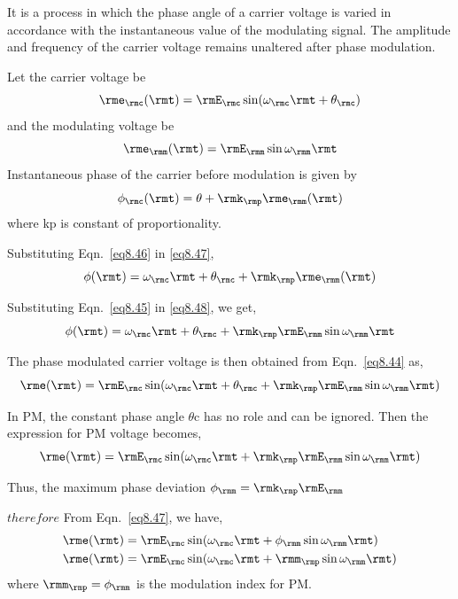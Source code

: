 It is a process in which the phase angle of a carrier voltage is
varied in accordance with the instantaneous value of the modulating
signal. The amplitude and frequency of the carrier voltage remains
unaltered after phase modulation.


\smallskip
Let the carrier voltage be
\begin{equation}
\rme_\rmc(\rmt) = \rmE_\rmc \sin (\omega_\rmc \rmt + \theta_\rmc)\label{eq8.41}
\end{equation}
and the modulating voltage be 
\begin{equation}
\rme_\rmm(\rmt) = \rmE_\rmm \sin \omega_\rmm \rmt \label{eq8.42}
\end{equation}
Instantaneous phase of the carrier before modulation is given by
\begin{equation}
\phi_\rmc (\rmt) = \theta + \rmk_\rmp \rme_\rmm(\rmt) \label{8.43}
\end{equation}
where kp is constant of proportionality.

Substituting Eqn.~\eqref{eq8.46} in \eqref{eq8.47},
\begin{equation}
\phi(\rmt) = \omega_\rmc \rmt + \theta_\rmc + \rmk_\rmp \rme_\rmm(\rmt)\label{eq8.44}
\end{equation}

Substituting Eqn.~\eqref{eq8.45} in \eqref{eq8.48}, we get,
\begin{equation}
\phi(\rmt) = \omega_\rmc \rmt + \theta_\rmc + \rmk_\rmp \rmE_\rmm \sin \omega_\rmm \rmt\label{eq8.45}
\end{equation}

The phase modulated carrier voltage is then obtained from
Eqn.~\eqref{eq8.44} as, 
\begin{equation}
\rme(\rmt) = \rmE_\rmc \sin (\omega_\rmc \rmt+ \theta_\rmc + \rmk_\rmp \rmE_\rmm \sin \omega_\rmm \rmt)\label{eq8.46}
\end{equation}

In PM, the constant phase angle $\theta$c has no role and can be
ignored. Then the expression for PM voltage becomes,
\begin{equation}
\rme(\rmt) = \rmE_\rmc \sin (\omega_\rmc \rmt + \rmk_\rmp \rmE_\rmm \sin \omega_\rmm \rmt)\label{eq8.47}
\end{equation}

Thus, the maximum phase deviation $\phi_\rmm = \rmk_\rmp \rmE_\rmm$

$therefore$ From Eqn.~\eqref{eq8.47}, we have,
\begin{align}
\rme(\rmt) & = \rmE_\rmc \sin (\omega_\rmc \rmt+ \phi_\rmm \sin \omega_\rmm \rmt) \label{eq8.48}\\
\rme(\rmt) & = \rmE_\rmc \sin (\omega_\rmc \rmt + \rmm_\rmp \sin \omega_\rmm \rmt)\label{eq8.49}
\end{align}
where $\rmm_\rmp= \phi_\rmm$ is the modulation index for PM.

